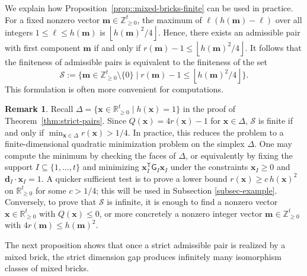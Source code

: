 \documentclass[a4,12pt]{amsart}
\numberwithin{equation}{section} %
\theoremstyle{definition} %
\newtheorem{remark}[theorem]{Remark} %
\begin{document}
We explain how Proposition~\ref{prop::mixed-bricks-finite} can be used in practice. For a fixed nonzero vector $\mathbf{m}\in\mathbb{Z}_{\geq 0}^t$, the maximum of $\ell(h(\mathbf{m})-\ell)$ over all integers $1\leq\ell\leq h(\mathbf{m})$ is $\left\lfloor h(\mathbf{m})^2/4\right\rfloor$. Hence, there exists an admissible pair with first component $\mathbf{m}$ if and only if $r(\mathbf{m})-1\leq \left\lfloor h(\mathbf{m})^2/4\right\rfloor$. It follows that the finiteness of admissible pairs is equivalent to the finiteness of the set 
\[
\mathcal{S}:=\{\mathbf{m}\in\mathbb{Z}_{\geq 0}^t\setminus\{0\}\mid r(\mathbf{m})-1\leq \left\lfloor h(\mathbf{m})^2/4\right\rfloor\}.
\]
This formulation is often more convenient for computations.

\begin{remark}
Recall $\Delta=\{\mathbf{x}\in\mathbb{R}_{\geq 0}^t\mid h(\mathbf{x})=1\}$ in the proof of Theorem~\ref{thm:strict-pairs}. Since $Q(\mathbf{x})=4r(\mathbf{x})-1$ for $\mathbf{x}\in\Delta$, $\mathcal{S}$ is finite if and only if $\min_{\mathbf{x}\in\Delta} r(\mathbf{x})>1/4$. In practice, this reduces the problem to a finite-dimensional quadratic minimization problem on the simplex $\Delta$.
One may compute the minimum by checking the faces of $\Delta$, or equivalently by fixing the support $I\subseteq\{1,\ldots,t\}$ and minimizing $\mathbf{x}_I^{\mathsf{T}}\mathsf{G}_I\mathbf{x}_I$ under the constraints $\mathbf{x}_I\geq0$ and $\mathbf{d}_I\cdot\mathbf{x}_I=1$.
A quicker sufficient test is to prove a lower bound $r(\mathbf{x})\geq c\,h(\mathbf{x})^2$ on $\mathbb{R}_{\geq 0}^t$ for some $c>1/4$; this will be used in Subsection \ref{subsec-example}. Conversely, to prove that $\mathcal{S}$ is infinite, it is enough to find a nonzero vector $\mathbf{x}\in\mathbb{R}_{\geq 0}^t$ with $Q(\mathbf{x})\leq0$, or more concretely a nonzero integer vector $\mathbf{m}\in\mathbb{Z}_{\geq 0}^t$ with $4r(\mathbf{m})\leq h(\mathbf{m})^2$.
\end{remark}
 
The next proposition shows that once a strict admissible pair is realized by a mixed brick, the strict dimension gap produces infinitely many isomorphism classes of mixed bricks.
\end{document}
